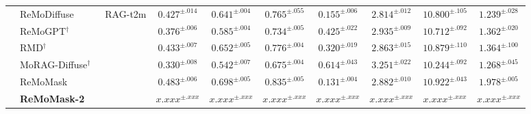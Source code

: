 \documentclass[10pt,journal,compsoc]{IEEEtran}
\begin{document}
\begin{table}[t]
{\begin{tabular}{l|l| c | c c c| c |c| c| c}
        \cline{2-10}
        \rule{0pt}{2.5ex} %
        & ReMoDiffuse~\cite{remodiffuse} & \multirow{6}{*}{RAG-t2m} &$0.427^{\pm.014}$& $0.641^{\pm.004}$& $0.765^{\pm.055}$ & $0.155^{\pm.006}$&$2.814^{\pm.012}$& $10.800^{\pm.105}$&$1.239^{\pm.028}$\\
        & ReMoGPT$^{\dag}$~\cite{remogpt} & &$0.376^{\pm.006}$& $0.585^{\pm.004}$& $0.734^{\pm.005}$ & $0.425^{\pm.022}$&$2.935^{\pm.009}$& $10.712^{\pm.092}$&$1.362^{\pm.020}$\\
        & RMD$^{\dag}$~\cite{rmd} & &$0.433^{\pm.007}$& $0.652^{\pm.005}$& $0.776^{\pm.004}$ & $0.320^{\pm.019}$&$2.863^{\pm.015}$& $10.879^{\pm.110}$&$1.364^{\pm.100}$\\
        & MoRAG-Diffuse$^{\dag}$~\cite{morag} & &$0.330^{\pm.008}$& $0.542^{\pm.007}$& $0.675^{\pm.004}$ & $0.614^{\pm.043}$&$3.251^{\pm.022}$& $10.244^{\pm.092}$&$1.268^{\pm.045}$\\
        \rowcolor[gray]{0.90} \cellcolor{white}  & ReMoMask & & $\mathbf{0.483^{\pm.006}}$ & $\mathbf{0.698^{\pm.005}}$& $\mathbf{0.835^{\pm.005}}$& $\mathbf{0.131^{\pm.004}}$ & $2.882^{\pm.010}$& $10.922^{\pm.043}$ & $\mathbf{1.978^{\pm.005}}$ \\
        \rowcolor{yellow!20} \cellcolor{white}  & \textbf{ReMoMask-2} & & $x.xxx^{\pm.xxx}$ & $x.xxx^{\pm.xxx}$& $x.xxx^{\pm.xxx}$& $x.xxx^{\pm.xxx}$ & $x.xxx^{\pm.xxx}$& $x.xxx^{\pm.xxx}$ & $x.xxx^{\pm.xxx}$ \\


\end{tabular}}
\end{table}
\end{document}
